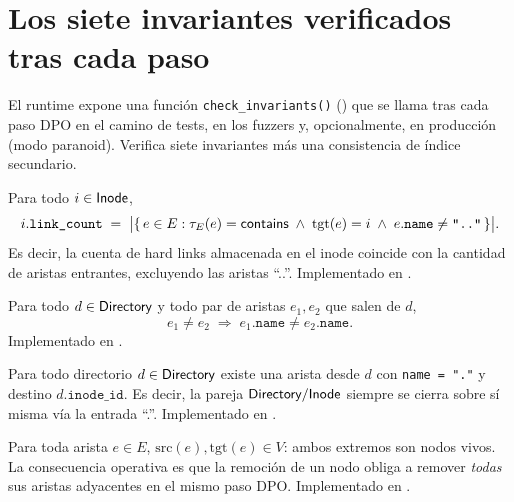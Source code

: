 \section{Los siete invariantes verificados tras cada paso}
\label{sec:invariantes}

El runtime expone una función \texttt{check\_invariants()}
() que se llama tras cada paso DPO
en el camino de tests, en los fuzzers y, opcionalmente, en producción
(modo paranoid). Verifica siete invariantes más una consistencia de índice
secundario.

\begin{invariante}
\label{inv:link-count}
Para todo $i \in \textsf{Inode}$,
\[
  i.\texttt{link\_count}
  \;=\;
  \bigl|\{\, e \in E : \tau_E(e) = \textsf{contains} \;\wedge\; \mathrm{tgt}(e) = i \;\wedge\; e.\texttt{name} \neq \texttt{".."} \,\}\bigr|.
\]
Es decir, la cuenta de hard links almacenada en el inode coincide con la
cantidad de aristas \econtains{} entrantes, excluyendo las aristas
``..''. Implementado en
.
\end{invariante}

\begin{invariante}
\label{inv:unique-names}
Para todo $d \in \textsf{Directory}$ y todo par de aristas $e_1, e_2$ \econtains{} que
salen de $d$,
\[
  e_1 \neq e_2 \;\Longrightarrow\; e_1.\texttt{name} \neq e_2.\texttt{name}.
\]
Implementado en .
\end{invariante}

\begin{invariante}
\label{inv:dir-self}
Para todo directorio $d \in \textsf{Directory}$ existe una arista \econtains{} desde
$d$ con \texttt{name = "."} y destino $d.\texttt{inode\_id}$. Es decir,
la pareja $\textsf{Directory}/\textsf{Inode}$ siempre se cierra sobre sí misma vía la entrada
``.''. Implementado en .
\end{invariante}

\begin{invariante}
\label{inv:no-dangling}
Para toda arista $e \in E$, $\mathrm{src}(e), \mathrm{tgt}(e) \in V$:
ambos extremos son nodos vivos. La consecuencia operativa es que la
remoción de un nodo obliga a remover \emph{todas} sus aristas adyacentes
en el mismo paso DPO. Implementado en
.
\end{invariante}

